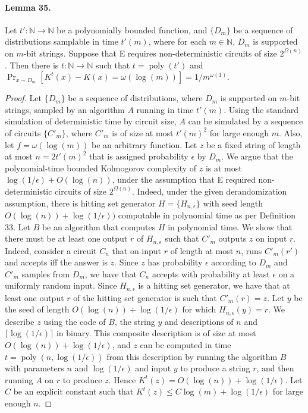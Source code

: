 \paragraph{Lemma 35.} Let $t':\mathbb N\to\mathbb N$ be a polynomially bounded function, and $\{D_m\}$ be a sequence of distributions samplable in time $t'(m)$, where for each $m\in\mathbb N$, $D_m$ is supported on $m$-bit strings. Suppose that E requires non-deterministic circuits of size $2^{\Omega(n)}$. Then there is $t:\mathbb N\to\mathbb N$ such that $t=\operatorname{poly}(t')$ and $\Pr_{x\sim D_m}[K^t(x)-K(x)=\omega(\log(m))]=1/m^{\omega(1)}$.
\begin{proof}Let $\{D_m\}$ be a sequence of distributions, where $D_m$ is supported on $m$-bit strings, sampled by an algorithm $A$ running in time $t'(m)$. Using the standard simulation of deterministic time by circuit size, $A$ can be simulated by a sequence of circuits $\{C'_m\}$, where $C'_m$ is of size at most $t'(m)^2$ for large enough $m$. Also, let $f=\omega(\log(m))$ be an arbitrary function.
Let $z$ be a fixed string of length at most $n=2t'(m)^2$ that is assigned probability $\epsilon$ by $D_m$. We argue that the polynomial-time bounded Kolmogorov complexity of $z$ is at most $\log(1/\epsilon)+O(\log(n))$, under the assumption that E required non-deterministic circuits of size $2^{\Omega(n)}$. Indeed, under the given derandomization assumption, there is hitting set generator $H=\{H_{n,\epsilon}\}$ with seed length $O(\log(n))+\log(1/\epsilon))$ computable in polynomial time as per Definition 33. Let $B$ be an algorithm that computes $H$ in polynomial time.
We show that there must be at least one output $r$ of $H_{n,\epsilon}$ such that $C'_m$ outputs $z$ on input $r$. Indeed, consider a circuit $C_n$ that on input $r$ of length at most $n$, runs $C'_m(r')$ and accepts iff the answer is $z$. Since $z$ has probability $\epsilon$ according to $D_m$ and $C'_m$ samples from $D_m$, we have that $C_n$ accepts with probability at least $\epsilon$ on a uniformly random input. Since $H_{n,\epsilon}$ is a hitting set generator, we have that at least one output $r$ of the hitting set generator is such that $C'_m(r)=z$.
Let $y$ be the seed of length $O(\log(n))+\log(1/\epsilon)$ for which $H_{n,\epsilon}(y)=r$. We describe $z$ using the code of $B$, the string $y$ and descriptions of $n$ and $\lceil\log(1/\epsilon)\rceil$ in binary. This composite description is of size at most $O(\log(n))+\log(1/\epsilon)$, and $z$ can be computed in time $t=\operatorname{poly}(n,\log(1/\epsilon))$ from this description by running the algorithm $B$ with parameters $n$ and $\log(1/\epsilon)$ and input $y$ to produce a string $r$, and then running $A$ on $r$ to produce $z$. Hence $K^t(z)=O(\log(n))+\log(1/\epsilon)$. Let $C$ be an explicit constant such that $K^t(z)\le C\log(m)+\log(1/\epsilon)$ for large enough $n$.

\end{proof}
